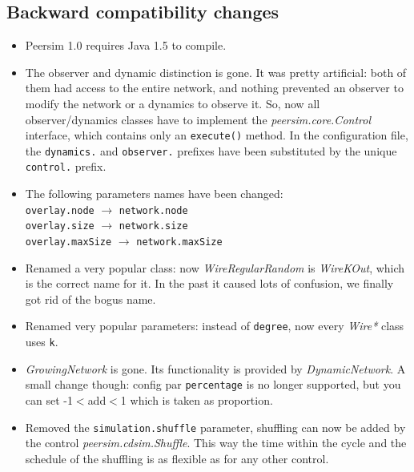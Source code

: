 \documentclass[a4paper,11pt]{article}
\begin{document}
\subsection{Backward compatibility changes}
\label{s:comp_change}

\begin{itemize}

\item Peersim 1.0 requires Java 1.5 to compile.

\item The observer and dynamic distinction is gone. It was pretty artificial:
  both of them had access to the entire network, and nothing prevented
  an observer to modify the network or a dynamics to observe it. So,
  now all observer/dynamics classes have to implement the 
  \emph{peersim.core.Control} interface, which contains only an
  \texttt{execute()} 
  method. In the configuration file, the \texttt{dynamics.} and
  \texttt{observer.} 
  prefixes have been substituted by the unique \texttt{control.} prefix. 

\item The following parameters names have been changed:\\
  \texttt{overlay.node} $\to$ \texttt{network.node}\\
  \texttt{overlay.size} $\to$ \texttt{network.size}\\
  \texttt{overlay.maxSize} $\to$ \texttt{network.maxSize}

\item Renamed a very popular class: now \emph{WireRegularRandom} is
  \emph{WireKOut}, which 
  is the correct name for it. In the past it caused lots of confusion, we
  finally got rid of the bogus name.

\item Renamed very popular parameters: instead of \texttt{degree}, now
  every \emph{Wire*}  
  class uses \texttt{k}.

\item \emph{GrowingNetwork} is gone. Its functionality is provided by 
  \emph{DynamicNetwork}. A small change though: config par
  \texttt{percentage} is no longer  
  supported, but you can set -1$<$add$<$1 which is taken as proportion.

\item Removed the \texttt{simulation.shuffle} parameter, shuffling can now be
  added by the control \emph{peersim.cdsim.Shuffle}. This way the time
  within the cycle and 
  the schedule of the shuffling is as flexible as for any other control.


\end{itemize}
\end{document}
